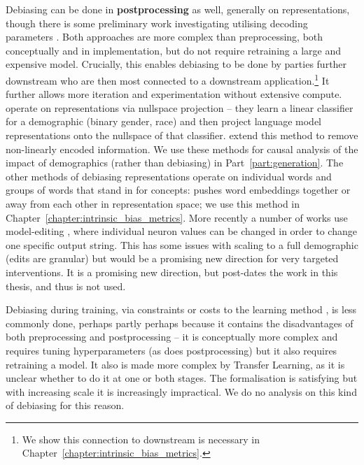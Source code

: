Debiasing can be done in \textbf{postprocessing} as well, generally on representations, though there is some preliminary work investigating utilising decoding parameters \citep{sheng-etal-2021-societal}. Both approaches are more complex than preprocessing, both conceptually and in implementation,  but do not require retraining a large and expensive model. Crucially, this enables debiasing to be done by parties further downstream who are then most connected to a downstream application.\footnote{We show this connection to downstream is necessary in Chapter~\ref{chapter:intrinsic_bias_metrics}.} It further allows more iteration and experimentation without extensive compute. \citet{ravfogel-etal-2020-null} operate on representations via nullspace projection -- they learn a linear classifier for a demographic (binary gender, race) and then project language model representations onto the nullspace of that classifier. \citet{iskander-etal-2023-shielded} extend this method to remove non-linearly encoded information. We use these methods for causal analysis of the impact of demographics (rather than debiasing) in Part~\ref{part:generation}. The other methods of debiasing representations operate on individual words and groups of words that stand in for concepts: \citet{mrksic-etal-2017-semantic} pushes word embeddings together or away from each other in representation space; we use this method in Chapter~\ref{chapter:intrinsic_bias_metrics}. More recently a number of works use  model-editing \citep{meng2022locating}, where individual neuron values can be changed in order to change one specific output string. This has some issues with scaling to a full demographic (edits are granular) but would be a promising new direction for very targeted interventions. It is a promising new direction, but post-dates the work in this thesis, and thus is not used. 

Debiasing during training, via constraints or costs to the learning method \citep{zhao-etal-2017-men}, is less commonly done, perhaps partly perhaps because it contains the disadvantages of both preprocessing and postprocessing -- it is conceptually more complex and requires tuning hyperparameters (as does postprocessing) but it also requires retraining a model. It also is made more complex by Transfer Learning, as it is unclear whether to do it at one or both stages. The formalisation is satisfying  but with increasing scale it is increasingly impractical. We do no analysis on this kind of debiasing for this reason.

